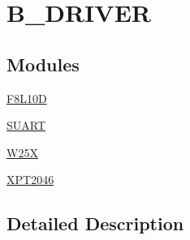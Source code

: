 \hypertarget{group___b___d_r_i_v_e_r}{}\section{B\+\_\+\+D\+R\+I\+V\+ER}
\label{group___b___d_r_i_v_e_r}
\subsection*{Modules}
\begin{DoxyCompactItemize}
\item 
\mbox{\hyperlink{group___f8_l10_d}{F8\+L10D}}
\item 
\mbox{\hyperlink{group___s_u_a_r_t}{S\+U\+A\+RT}}
\item 
\mbox{\hyperlink{group___w25_x}{W25X}}
\item 
\mbox{\hyperlink{group___x_p_t2046}{X\+P\+T2046}}
\end{DoxyCompactItemize}


\subsection{Detailed Description}
